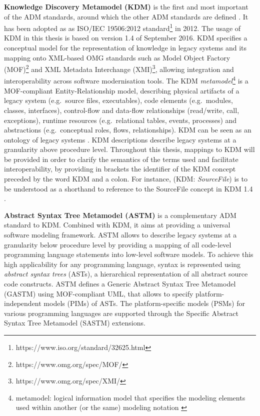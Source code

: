 \textbf{Knowledge Discovery Metamodel (KDM)} \autocite{OMG2016KDM} is the first and most important of the ADM standards, around which the other ADM standards are defined \autocite{Perez-Castillo2011KDM}.
It has been adopted as as ISO/IEC 19506:2012 standard\footnote{https://www.iso.org/standard/32625.html} in 2012.
The usage of KDM in this thesis is based on version 1.4 of September 2016.
KDM specifies a conceptual model for the representation of knowledge in legacy systems and its mapping onto XML-based OMG standards such as Model Object Factory (MOF)\footnote{https://www.omg.org/spec/MOF/} and XML Metadata Interchange (XMI)\footnote{https://www.omg.org/spec/XMI/}, allowing integration and interoperability across software modernisation tools.
The KDM \emph{metamodel}\footnote{metamodel: logical information model that specifies the modeling elements used within another (or the same) modeling notation \autocite{ISO/IEEE24765Vocabulary}} is a MOF-compliant Entity-Relationship model, describing physical artifacts of a legacy system (e.g.~source files, executables), code elements (e.g.~modules, classes, interfaces), control-flow and data-flow relationships (read/write, call, exceptions), runtime resources (e.g.~relational tables, events, processes) and abstractions (e.g.~conceptual roles, flows, relationships).
KDM can be seen as an ontology of legacy systems \autocite{Perez-Castillo2011KDM}.
KDM descriptions describe legacy systems at a granularity above procedure level.
Throughout this thesis, mappings to KDM will be provided in order to clarify the semantics of the terms used and facilitate interoperability, by providing in brackets the identifier of the KDM concept preceded by the word KDM and a colon.
For instance, (KDM: \emph{SourceFile}) is to be understood as a shorthand to reference to the SourceFile concept in KDM 1.4 \autocite{OMG2016KDM}.

\textbf{Abstract Syntax Tree Metamodel (ASTM)} \autocite{OMG2011ASTM} is a complementary ADM standard to KDM.
Combined with KDM, it aims at providing a universal software modeling framework.
ASTM allows to describe legacy systems at a granularity below procedure level by providing a mapping of all code-level programming language statements into low-level software models.
To achieve this high applicability for any programming language, syntax is represented using \emph{abstract syntax trees} (ASTs), a hierarchical representation of all abstract source code constructs.
ASTM defines a Generic Abstract Syntax Tree Metamodel (GASTM) using MOF-compliant UML, that allows to specify platform-independent models (PIMs) of ASTs.
The platform-specific models (PSMs) for various programming languages are supported through the Specific Abstract Syntax Tree Metamodel (SASTM) extensions.

